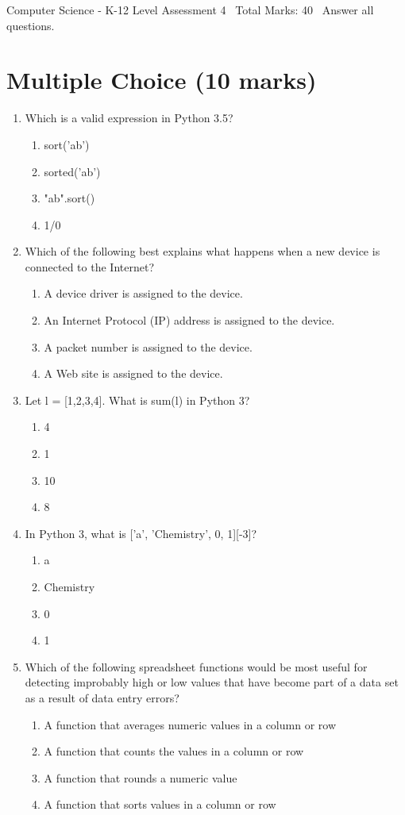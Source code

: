 \documentclass[12pt]{article}
\begin{document}
\begin{center}
Computer Science - K-12 Level Assessment 4 \
Total Marks: 40 \
Answer all questions.
\end{center}

\section*{Multiple Choice (10 marks)}
\begin{enumerate}[label=\arabic*.]
\item Which is a valid expression in Python 3.5?
\begin{enumerate}[label=(\alph*)]
    \item sort('ab')
    \item sorted('ab')
    \item "ab".sort()
    \item 1/0
\end{enumerate}
\item Which of the following best explains what happens when a new device is connected to the Internet?
\begin{enumerate}[label=(\alph*)]
    \item A device driver is assigned to the device.
    \item An Internet Protocol (IP) address is assigned to the device.
    \item A packet number is assigned to the device.
    \item A Web site is assigned to the device.
\end{enumerate}
\item Let l = [1,2,3,4]. What is sum(l) in Python 3?
\begin{enumerate}[label=(\alph*)]
    \item 4
    \item 1
    \item 10
    \item 8
\end{enumerate}
\item In Python 3, what is ['a', 'Chemistry', 0, 1][-3]?
\begin{enumerate}[label=(\alph*)]
    \item a
    \item Chemistry
    \item 0
    \item 1
\end{enumerate}
\item Which of the following spreadsheet functions would be most useful for detecting improbably high or low values that have become part of a data set as a result of data entry errors?
\begin{enumerate}[label=(\alph*)]
    \item A function that averages numeric values in a column or row
    \item A function that counts the values in a column or row
    \item A function that rounds a numeric value
    \item A function that sorts values in a column or row
\end{enumerate}
\end{enumerate}
\end{document}
